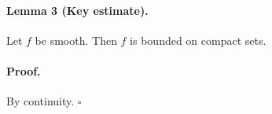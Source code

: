 \documentclass{article}
\begin{document}
\paragraph{Lemma 3 (Key estimate).} Let $f$ be smooth. Then $f$ is bounded on compact sets.

\paragraph{Proof.} By continuity. $\square$
\end{document}
